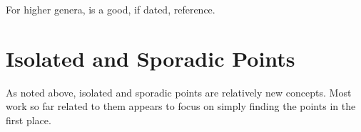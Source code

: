 \documentclass[12pt, reqno]{amsart}
\numberwithin{equation}{section}
\numberwithin{table}{section}
\begin{document}
For higher genera, \cite{Caporaso1995} is a good, if dated, reference.

\section{Isolated and Sporadic Points}

As noted above, isolated and sporadic points are relatively new
concepts. Most work so far related to them appears to focus on simply
finding the points in the first place.


\end{document}
